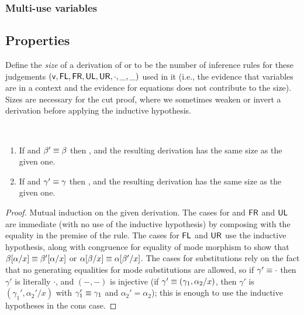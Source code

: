\subsubsection{Multi-use variables}

\subsection{Properties}

Define the \emph{size} of a derivation of  or
\seq{\Gamma}{\gamma}{\Delta} to be the number of inference rules for
these judgements $(\mathsf{v},\mathsf{FL}, \mathsf{FR}, \mathsf{UL}, \mathsf{UR},
\cdot, \_,\_)$ used in it (i.e., the evidence that variables are in a
context and the evidence for equations does not contribute to the size).
Sizes are necessary for the cut proof, where we sometimes weaken or
invert a derivation before applying the inductive hypothesis.

\begin{lemma} ~ \label{lemma:respecteq}
\begin{enumerate}
\item If  and $\beta' \equiv \beta$ then
, and the resulting derivation has the same size
as the given one.
\item If \seq{\Gamma}{\gamma}{\Delta} and $\gamma' \equiv \gamma$ then
  , and the resulting derivation has the
  same size as the given one.
\end{enumerate}
\end{lemma}
\begin{proof}
Mutual induction on the given derivation.  The cases for  and
$\mathsf{FR}$ and $\mathsf{UL}$ are immediate (with no use of the inductive
hypothesis) by composing with the equality in the premise of the rule.
The cases for $\mathsf{FL}$ and $\mathsf{UR}$ use the inductive hypothesis,
along with congruence for equality of mode morphism to show that
$\beta[\alpha/x] \equiv \beta'[\alpha/x]$ or
$\alpha[\beta/x] \equiv \alpha[\beta'/x]$.  The cases
for substitutions rely on the fact that no generating equalities for
mode substitutions are allowed, so if $\gamma' \equiv \cdot$ then
$\gamma'$ is literally $\cdot$, and $(-,-)$ is injective (if $\gamma'
\equiv (\gamma_1,\alpha_2/x)$, then $\gamma'$ is $(\gamma_1',\alpha_2'/x)$
with $\gamma_1' \equiv \gamma_1$ and $\alpha_2' = \alpha_2$); this is
enough to use the inductive hypotheses in the cons case.  
\end{proof}

